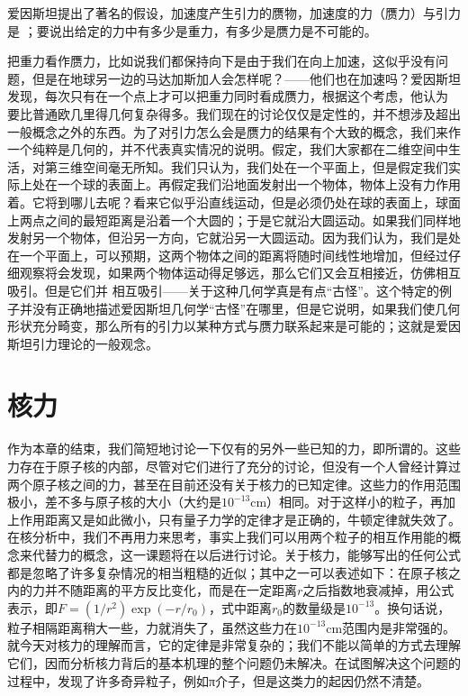 \documentclass[12pt,oneside]{book}
\begin{document}
爱因斯坦提出了著名的假设，加速度产生引力的赝物，加速度的力（赝力）与引力是 ；要说出给定的力中有多少是重力，有多少是赝力是不可能的。


把重力看作赝力，比如说我们都保持向下是由于我们在向上加速，这似乎没有问题，但是在地球另一边的马达加斯加人会怎样呢？——他们也在加速吗？爱因斯坦发现，每次只有在一个点上才可以把重力同时看成赝力，根据这个考虑，他认为  要比普通欧几里得几何复杂得多。我们现在的讨论仅仅是定性的，并不想涉及超出一般概念之外的东西。为了对引力怎么会是赝力的结果有个大致的概念，我们来作一个纯粹是几何的，并不代表真实情况的说明。假定，我们大家都在二维空间中生活，对第三维空间毫无所知。我们只认为，我们处在一个平面上，但是假定我们实际上处在一个球的表面上。再假定我们沿地面发射出一个物体，物体上没有力作用着。它将到哪儿去呢？看来它似乎沿直线运动，但是必须仍处在球的表面上，球面上两点之间的最短距离是沿着一个大圆的；于是它就沿大圆运动。如果我们同样地发射另一个物体，但沿另一方向，它就沿另一大圆运动。因为我们认为，我们是处在一个平面上，可以预期，这两个物体之间的距离将随时间线性地增加，但经过仔细观察将会发现，如果两个物体运动得足够远，那么它们又会互相接近，仿佛相互吸引。但是它们并  相互吸引——关于这种几何学真是有点“古怪”。这个特定的例子并没有正确地描述爱因斯坦几何学“古怪”在哪里，但是它说明，如果我们使几何形状充分畸变，那么所有的引力以某种方式与赝力联系起来是可能的；这就是爱因斯坦引力理论的一般观念。

\section{核力}
作为本章的结束，我们简短地讨论一下仅有的另外一些已知的力，即所谓的。这些力存在于原子核的内部，尽管对它们进行了充分的讨论，但没有一个人曾经计算过两个原子核之间的力，甚至在目前还没有关于核力的已知定律。这些力的作用范围极小，差不多与原子核的大小（大约是$ 10^{-13} $cm）相同。对于这样小的粒子，再加上作用距离又是如此微小，只有量子力学的定律才是正确的，牛顿定律就失效了。在核分析中，我们不再用力来思考，事实上我们可以用两个粒子的相互作用能的概念来代替力的概念，这一课题将在以后进行讨论。关于核力，能够写出的任何公式都是忽略了许多复杂情况的相当粗糙的近似；其中之一可以表述如下：在原子核之内的力并不随距离的平方反比变化，而是在一定距离$ r $之后指数地衰减掉，用公式表示，即$ F=(1/r^2)\exp(-r/r_0) $，式中距离$ r_0 $的数量级是$ 10^{-13} $。换句话说，粒子相隔距离稍大一些，力就消失了，虽然这些力在$ 10^{-13} $cm范围内是非常强的。就今天对核力的理解而言，它的定律是非常复杂的；我们不能以简单的方式去理解它们，因而分析核力背后的基本机理的整个问题仍未解决。在试图解决这个问题的过程中，发现了许多奇异粒子，例如π介子，但是这类力的起因仍然不清楚。
\end{document}

